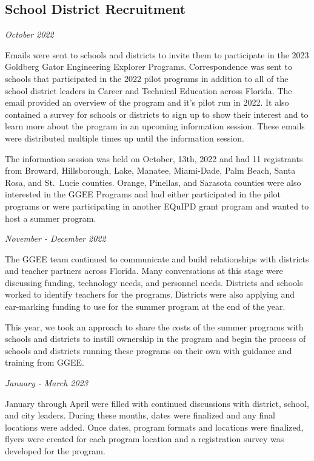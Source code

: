 \documentclass[
]{article}
\begin{document}
\hypertarget{school-district-recruitment}{%
\subsection{School District
Recruitment}\label{school-district-recruitment}}

\emph{October 2022}

Emails were sent to schools and districts to invite them to participate
in the 2023 Goldberg Gator Engineering Explorer Programs. Correspondence
was sent to schools that participated in the 2022 pilot programs in
addition to all of the school district leaders in Career and Technical
Education across Florida. The email provided an overview of the program
and it's pilot run in 2022. It also contained a survey for schools or
districts to sign up to show their interest and to learn more about the
program in an upcoming information session. These emails were
distributed multiple times up until the information session.

The information session was held on October, 13th, 2022 and had 11
registrants from Broward, Hillsborough, Lake, Manatee, Miami-Dade, Palm
Beach, Santa Rosa, and St.~Lucie counties. Orange, Pinellas, and
Sarasota counties were also interested in the GGEE Programs and had
either participated in the pilot programs or were participating in
another EQuIPD grant program and wanted to host a summer program.

\emph{November - December 2022}

The GGEE team continued to communicate and build relationships with
districts and teacher partners across Florida. Many conversations at
this stage were discussing funding, technology needs, and personnel
needs. Districts and schools worked to identify teachers for the
programs. Districts were also applying and ear-marking funding to use
for the summer program at the end of the year.

This year, we took an approach to share the costs of the summer programs
with schools and districts to instill ownership in the program and begin
the process of schools and districts running these programs on their own
with guidance and training from GGEE.

\emph{January - March 2023}

January through April were filled with continued discussions with
district, school, and city leaders. During these months, dates were
finalized and any final locations were added. Once dates, program
formats and locations were finalized, flyers were created for each
program location and a registration survey was developed for the
program.
\end{document}

